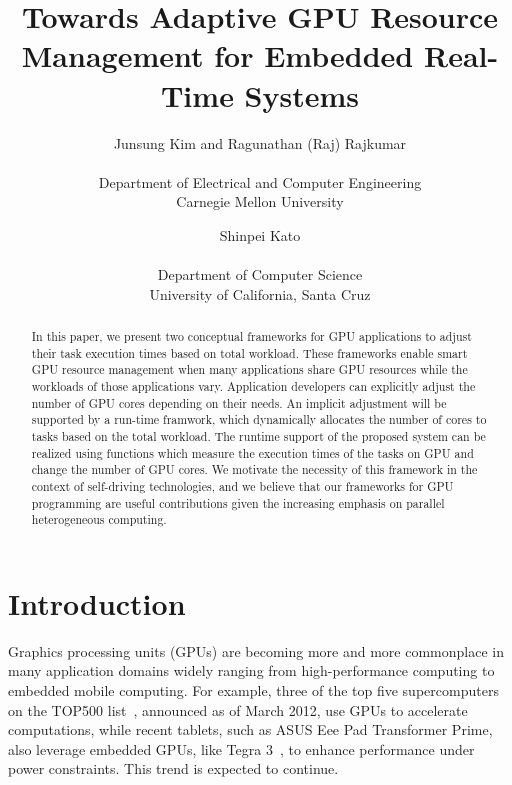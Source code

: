 \documentclass[times, 10pt, twocolumn]{article}
\begin{document}
\title{
Towards Adaptive GPU Resource Management for Embedded Real-Time Systems
}

\author {
Junsung Kim and Ragunathan (Raj) Rajkumar\\
\\
Department of Electrical and Computer Engineering\\
Carnegie Mellon University
\and
Shinpei Kato\\
\\
Department of Computer Science\\
University of California, Santa Cruz
}

\maketitle

\thispagestyle{empty}

\begin{abstract}
 In this paper, we present two conceptual frameworks for GPU applications to
 adjust their task execution times based on total workload. These  
 frameworks enable smart GPU resource management when many applications 
 share GPU resources while the workloads of those applications vary. 
 Application 
 developers can explicitly adjust the number of GPU cores depending on their needs. 
 An implicit adjustment will be supported by a run-time framwork, which 
 dynamically allocates the number of cores to tasks based on the total 
 workload. The runtime support of the proposed system can be realized using 
 functions which measure the execution times of the tasks on GPU and change 
 the number of GPU cores. We motivate the necessity of this framework 
 in the context of self-driving technologies, and we believe that our 
 frameworks for GPU programming are useful contributions given 
 the increasing emphasis on 
 parallel heterogeneous computing.
\end{abstract}

\section{Introduction}
\label{sec:introduction}

Graphics processing units (GPUs) are becoming more and more commonplace
in many application domains widely ranging from high-performance
computing to embedded mobile computing.
For example, three of the top five supercomputers on the TOP500
list~\cite{TOP500}, announced as of March 2012, use GPUs to accelerate
computations, while recent tablets, such as ASUS Eee Pad Transformer
Prime, also leverage embedded GPUs, like Tegra
3~\cite{Tegra3}, to enhance performance under power constraints.
This trend is expected to continue. 
\end{document}
